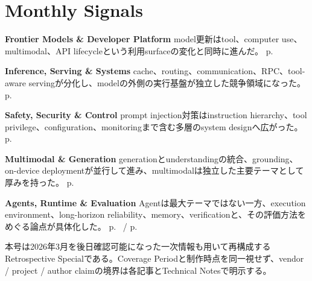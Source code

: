 \section*{Monthly Signals}
\smallskip
\noindent\textbf{Frontier Models \& Developer Platform} model更新はtool、computer use、multimodal、API lifecycleという利用surfaceの変化と同時に進んだ。 \hfill{\footnotesize p.~\pageref{pkg:frontier-models-platform-march}}\par
\smallskip
\noindent\textbf{Inference, Serving \& Systems} cache、routing、communication、RPC、tool-aware servingが分化し、modelの外側の実行基盤が独立した競争領域になった。 \hfill{\footnotesize p.~\pageref{pkg:inference-serving-systems-march}}\par
\smallskip
\noindent\textbf{Safety, Security \& Control} prompt injection対策はinstruction hierarchy、tool privilege、configuration、monitoringまで含む多層のsystem designへ広がった。 \hfill{\footnotesize p.~\pageref{pkg:safety-security-control-march}}\par
\smallskip
\noindent\textbf{Multimodal \& Generation} generationとunderstandingの統合、grounding、on-device deploymentが並行して進み、multimodalは独立した主要テーマとして厚みを持った。 \hfill{\footnotesize p.~\pageref{pkg:multimodal-generation-march}}\par
\smallskip
\noindent\textbf{Agents, Runtime \& Evaluation} Agentは最大テーマではない一方、execution environment、long-horizon reliability、memory、verificationと、その評価方法をめぐる論点が具体化した。 \hfill{\footnotesize p.~\pageref{pkg:agents-runtime-long-horizon-march} / p.~\pageref{pkg:paper-watch-march}}\par
\medskip
\begin{claimboundary}
本号は2026年3月を後日確認可能になった一次情報も用いて再構成するRetrospective Specialである。Coverage Periodと制作時点を同一視せず、vendor / project / author claimの境界は各記事とTechnical Notesで明示する。
\end{claimboundary}
\medskip
\tableofcontents
